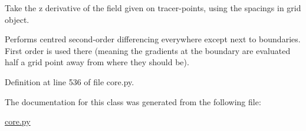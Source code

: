 Take the z derivative of the field given on tracer-\/points, using the spacings in grid object. 

Performs centred second-\/order differencing everywhere except next to boundaries. First order is used there (meaning the gradients at the boundary are evaluated half a grid point away from where they should be). 

Definition at line 536 of file core.\+py.



The documentation for this class was generated from the following file\+:\begin{DoxyCompactItemize}
\item 
\hyperlink{core_8py}{core.\+py}\end{DoxyCompactItemize}
